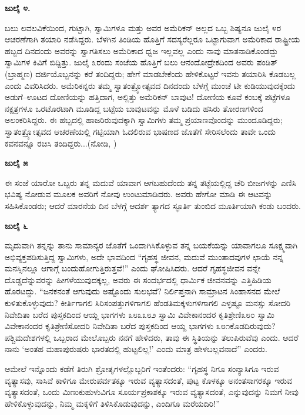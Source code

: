 \textbf{ಜುಲೈ ೪.}

ಬಲು ಲವಲವಿಕೆಯಿಂದ, ಗುಟ್ಟಾಗಿ, ಸ್ವಾಮಿಗಳೂ ಮತ್ತು ಅವರ ಅಮೆರಿಕನ್ ಅಲ್ಲದ ಒಬ್ಬ ಶಿಷ್ಯನೂ ಜುಲೈ ೪ರ ಆಚರಣೆಗಾಗಿ ತಯಾರಿ ನಡೆಸಿದ್ದರು. ಬೆಳಗಿನ ತಿಂಡಿಯ ಹೊತ್ತಿಗೆ ಸದಸ್ಯರೆಲ್ಲರೂ ಒಟ್ಟಾಗುವಾಗ ಅಮೆರಿಕಾದ ರಾಷ್ಟ್ರೀಯ ಹಬ್ಬದ ದಿನದಂದು ಅವರನ್ನು ಸ್ವಾಗತಿಸಲು ಅಮೆರಿಕಾದ ಧ್ವಜ ಇಲ್ಲವಲ್ಲ ಎಂದು ನಾವು ಮಾತನಾಡಿಕೊಂಡದ್ದು ಸ್ವಾಮಿಗಳ ಕಿವಿಗೆ ಬಿದ್ದಿತ್ತು. ಜುಲೈ ೩ರಂದು ಸಂಜೆಯ ಹೊತ್ತಿಗೆ ಬಲು ಆನಂದೋದ್ರೇಕದಿಂದ ಅವರು ಪಂಡಿತ್ (ಬ್ರಾಹ್ಮಣ) ದರ್ಜಿಯೊಬ್ಬನನ್ನು ಕರೆ ತಂದಿದ್ದರು; ಹೇಗೆ ಮಾಡಬೇಕೆಂದು ಹೇಳಿಕೊಟ್ಟರೆ ಇವನು ತಯಾರಿಸಿ ಕೊಡಬಲ್ಲ ಎಂದು ವಿವರಿಸಿದರು. ಅಮೆರಿಕನ್ನರು ತಮ್ಮ ಸ್ವಾತಂತ್ರ್ಯೋತ್ಸವದ ದಿನದಂದು ಬೆಳಗ್ಗೆ ಮುಂಚೆ ಟೀ ಕುಡಿಯುವುದಕ್ಕೆಂದು ಅಡುಗೆ–ಊಟದ ದೋಣಿಯನ್ನು ಹತ್ತಿದಾಗ, ಅಲ್ಲಿತ್ತು ಅಮೆರಿಕನ್ ಬಾವುಟ! ದೋಣಿಯ ಕೂವೆ ಕಂಬಕ್ಕೆ ಪಟ್ಟೆಗಳೂ ನಕ್ಷತ್ರಗಳೂ ಒರಟೊರಟಾಗಿ ಮೂಡಿದ್ದ ಬಟ್ಟೆಯ ಬಾವುಟವನ್ನು ಮೊಳೆ ಬಡಿದು ಹಸಿರು ತೋರಣಗಳಿಂದ ಅಲಂಕರಿಸಿದ್ದರು. ಈ ಹಬ್ಬದಲ್ಲಿ ಹಾಜರಿರುವುದಕ್ಕಾಗಿ ಸ್ವಾಮಿಗಳು ತಮ್ಮ ಪ್ರಯಾಣವೊಂದನ್ನು ಮುಂದೂಡಿದ್ದರು; ಸ್ವಾತಂತ್ರ್ಯೋತ್ಸವದ ಆಚರಣೆಯಲ್ಲಿ ಗಟ್ಟಿಯಾಗಿ ಓದಲಿರುವ ಭಾಷಣದ ಜೊತೆಗೆ ಸೇರಿಸಲೆಂದು ತಾವೇ ಒಂದು ಕವನವನ್ನೂ ರಚಿಸಿ ತಂದಿದ್ದರು...(ನೋಡಿ, )

\textbf{ಜುಲೈ ೫}

ಈ ಸಂಜೆ ಯಾರೋ ಒಬ್ಬರು ತನ್ನ ಮದುವೆ ಯಾವಾಗ ಆಗಬಹುದೆಂದು ತನ್ನ ತಟ್ಟೆಯಲ್ಲಿದ್ದ ಚೆರಿ ಬೀಜಗಳನ್ನು ಎಣಿಸಿ ಭವಿಷ್ಯ ನೋಡುವ ಮೂಲಕ ಅವರಿಗೆ ನೋವು ಉಂಟುಮಾಡಿದರು. ಅವರು ಹೇಗೋ ಮಾಡಿ ಈ ಆಟವನ್ನು ಸಹಿಸಿಕೊಂಡರು; ಆದರೆ ಮಾರನೆಯ ದಿನ ಬೆಳಗ್ಗೆ ಆದರ್ಶ ತ್ಯಾಗದ ಸ್ಫೂರ್ತಿ ತುಂಬಿದ ಮೂರ್ತಿಯಾಗಿ ಕಂಡು ಬಂದರು.

\textbf{ಜುಲೈ ೬}

ಮೃದುವಾಗಿ ತನ್ನನ್ನು ತಾನು ಸಾಮಾನ್ಯರ ಜೊತೆಗೆ ಒಂದಾಗಿಸಿಕೊಳ್ಳುವ ತನ್ನ ಬಯಕೆಯನ್ನು ಯಾವಾಗಲೂ ಸೂಕ್ಷ್ಮವಾಗಿ ಅಭಿವ್ಯಕ್ತಪಡಿಸುತ್ತಿದ್ದ ಸ್ವಾಮಿಗಳು, ಅದೇ ಭಾವದಿಂದ “ಗೃಹಸ್ಥ ಜೀವನ, ಮದುವೆ ಮುಂತಾದವುಗಳ ಛಾಯೆ ನನ್ನ ಮನಸ್ಸಿನಲ್ಲೂ ಆಗಾಗ್ಗೆ ಬಂದುಹೋಗುತ್ತಿರುತ್ತವೆ!” ಎಂದು ಘೋಷಿಸಿದರು. ಆದರೆ ಗೃಹಸ್ಥಜೀವನ ವನ್ನೇ ದೊಡ್ಡದೆನ್ನುವರನ್ನು ಹೀಗಳೆಯುವುದಕ್ಕಲ್ಲ, ಅವರು ಈ ಸಂದರ್ಭದಲ್ಲಿ ಧಾರ್ಮಿಕ ಜೀವನವನ್ನು ಎತ್ತಿಹಿಡಿಯ ಹೊರಟದ್ದು. “ಜನಕನಂತೆ ಆಗುವುದು ಅಷ್ಟೊಂದು ಸುಲಭವೆ? ನಿರ್ಲಿಪ್ತನಾಗಿ ಸಾಮ್ರಾಟನ ಸಿಂಹಾಸನದ ಮೇಲೆ ಕುಳಿತುಕೊಳ್ಳುವುದು? ಕೀರ್ತಿಗಾಗಲಿ ಸಿರಿಸಂಪತ್ತುಗಳಿಗಾಗಲಿ ಹೆಂಡತಿಮಕ್ಕಳುಗಳಿಗಾಗಲಿ ಎಳ್ಳಷ್ಟೂ ಮನಸ್ಸು ಸೋದರಿ ನಿವೇದಿತಾ ಬರೆದ ಪುಸ್ತಕದಿಂದ ಆಯ್ದ ಭಾಗಗಳು ೩೮೩೩೮೨ ಸ್ವಾಮಿ ವಿವೇಕಾನಂದರ ಕೃತಿಶ್ರೇಣಿ೩೮೦ ಸ್ವಾಮಿ ವಿವೇಕಾನಂದರ ಕೃತಿಶ್ರೇಣಿಸೋದರಿ ನಿವೇದಿತಾ ಬರೆದ ಪುಸ್ತಕದಿಂದ ಆಯ್ದ ಭಾಗಗಳು ೩೮೧ಕೊಡದಿರುವುದು? ಪಶ್ಚಿಮದೇಶಗಳಲ್ಲಿ ಒಬ್ಬರಾದ ಮೇಲೊಬ್ಬರು ನನಗೆ ಹೇಳಿದರು, ತಾವು ಈ ಸ್ಥಿತಿಯನ್ನು ತಲುಪಿರುವೆವು ಎಂದು. ಆದರೆ ನಾನು ‘ಅಂತಹ ಮಹಾಪುರುಷರು ಭಾರತದಲ್ಲಿ ಹುಟ್ಟಲಿಲ್ಲ!’ ಎಂದು ಮಾತ್ರ ಹೇಳಬಲ್ಲವನಾದೆ” ಎಂದರು.

ಆಮೇಲೆ ಇನ್ನೊಂದು ಕಡೆಗೆ ತಿರುಗಿ ಶ್ರೋತೃಗಳಲ್ಲೊಬ್ಬರಿಗೆ ಇಂತೆಂದರು: “ಗೃಹಸ್ಥ ನಿಗೂ ಸಂನ್ಯಾಸಿಗೂ ಇರುವ ವ್ಯತ್ಯಾಸವು, ಸಾಸಿವೆ ಕಾಳಿಗೂ ಮೇರುಪರ್ವತಕ್ಕೂ ಇರುವ ವ್ಯತ್ಯಾಸದಂತೆ, ಪುಟ್ಟ ಕೊಳಕ್ಕೂ ಅನಂತಸಾಗರಕ್ಕೂ ಇರುವ ವ್ಯತ್ಯಾಸದಂತೆ, ಒಂದು ಮಿಣುಕುಹುಳುವಿಗೂ ಸೂರ್ಯಪ್ರಕಾಶಕ್ಕೂ ಇರುವ ವ್ಯತ್ಯಾಸದಂತೆ, ಎನ್ನುವುದನ್ನು ನಿಮಗೆ ನೀವು ಹೇಳಿಕೊಳ್ಳುವುದನ್ನು, ನಿಮ್ಮ ಮಕ್ಕಳಿಗೆ ತಿಳಿಸಿಕೊಡುವುದನ್ನು, ಎಂದಿಗೂ ಮರೆಯದಿರಿ!”

